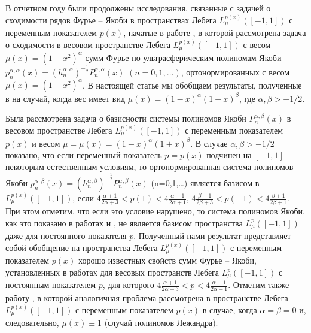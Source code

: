 
В отчетном году были продолжены исследования, связанные с задачей о сходимости рядов Фурье -- Якоби в пространствах Лебега  $L^{p(x)}_\mu([-1,1])$ с переменным показателем $p(x)$, начатые в работе \cite{ShIIBJWShar41}, в которой рассмотрена задача о сходимости в весовом пространстве Лебега $L^{p(x)}_\mu([-1,1])$ с весом $\mu(x)=(1-x^2)^\alpha$ сумм Фурье по ультрасферическим полиномам Якоби $p_n^{\alpha,\alpha}(x)=(h_n^{\alpha,\alpha})^{-\frac12}P_n^{\alpha,\alpha}(x)$ $(n=0,1,\ldots)$, ортонормированных с весом $\mu(x)=(1-x^2)^\alpha$. В настоящей статье мы обобщаем результаты, полученные в  \cite{ShIIBJWShar41} на случай, когда вес имеет вид $\mu(x)=(1-x)^\alpha(1+x)^\beta$, где $\alpha,\beta>-1/2$.


Была рассмотрена задача о базисности системы полиномов Якоби $P_n^{\alpha,\beta}(x)$ в весовом пространстве Лебега $L^{p(x)}_\mu([-1,1])$ с переменным показателем $p(x)$ и весом $\mu=\mu(x)=(1-x)^\alpha(1+x)^\beta$. В случае $\alpha,\beta>-1/2$ показано, что если переменный показатель $p=p(x)$ подчинен  на $[-1,1]$ некоторым естественным условиям, то ортонормированная система  полиномов Якоби $p_n^{\alpha,\beta}(x)=(h_n^{\alpha,\beta})^{-\frac12}P_n^{\alpha,\beta}(x)$ (n=0,1,\ldots) является базисом в $L^{p(x)}_\mu([-1,1])$, если
$4\frac{\alpha+1}{2\alpha+3}<p(1)<4\frac{\alpha+1}{2\alpha+1}$, $4\frac{\beta+1}{2\beta+3}<p(-1)<4\frac{\beta+1}{2\beta+1}$.
При этом отметим, что если это  условие нарушено, то система полиномов Якоби, как это показано в работах \cite{ShIIBJWNewmanRudin} и \cite{ShIIBJWMuckenhoupt1},  не является базисом пространства $L^{p}_\mu([-1,1])$ даже для постоянного показателя $p$. Полученный нами  результат представляет собой обобщение на пространства Лебега $L^{p(x)}_\mu([-1,1])$ с переменным показателем $p(x)$ хорошо известных свойств сумм Фурье -- Якоби, установленных в работах   \cite{ShIIBJWPollard1,ShIIBJWPollard2,ShIIBJWPollard3,ShIIBJWNewmanRudin,ShIIBJWMuckenhoupt1} для весовых пространств Лебега $L^{p}_\mu([-1,1])$ с постоянным показателем $p$, для которого $4\frac{\alpha+1}{2\alpha+3}<p<4\frac{\alpha+1}{2\alpha+1}$.
Отметим также работу \cite{ShIIBJWSharap1}, в которой аналогичная проблема рассмотрена в  пространстве Лебега $L^{p(x)}_\mu([-1,1])$ с переменным показателем $p(x)$ в случае, когда $\alpha=\beta=0$ и, следовательно, $\mu(x)\equiv1$ (случай полиномов Лежандра).




